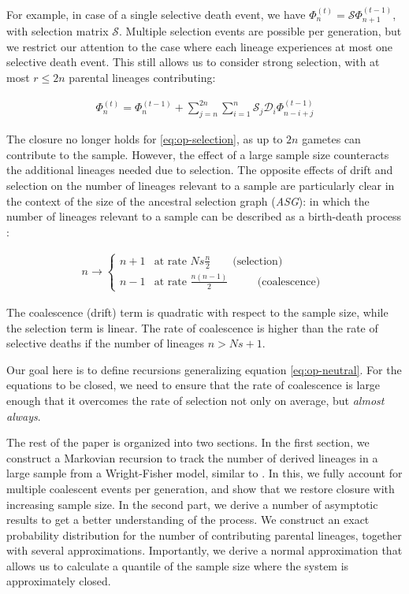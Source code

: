\documentclass[review]{elsarticle}
\newcommand{\ra}{\rightarrow}
\begin{document}
For example, in case of a single selective death event, we have
$\Phi_{n}^{(t)}=\mathcal{S}\Phi_{n+1}^{(t-1)}$, with selection matrix $\mathcal{S}$. Multiple
selection events are possible per generation, but we restrict our attention to the case where each
lineage experiences at most one selective death event. This still allows us to consider strong
selection, with at most $r\le 2n$ parental lineages contributing:

\begin{align}
  \label{eq:op-selection}
  \Phi_{n}^{(t)}=\Phi_{n}^{(t-1)}+ \sum_{j=n}^{2n} \sum_{i=1}^{n} \mathcal{S}_j \mathcal{D}_i \Phi_{n-i+j}^{(t-1)}
\end{align}

The closure no longer holds for \eqref{eq:op-selection}, as up to $2n$ gametes can contribute to the
sample. However, the effect of a large sample size counteracts the additional lineages needed due to
selection. The opposite effects of drift and selection on the number of lineages relevant to a
sample are particularly clear in the context of the size of the ancestral selection graph
(\textit{ASG}): in which the number of lineages relevant to a sample can be described as a
birth-death process \citep{KroneNeuhauser1997, Wakeley2009}:

\begin{align}
  \label{eq:asg-size}
  n \ra \begin{cases}
    n+1 & \text{at rate } Ns \frac{n}{2} \hspace{20pt} \text{ (selection) }\\
    n-1 & \text{at rate } \frac{n(n-1)}{2}   \hspace{28pt} \text{ (coalescence) }
  \end{cases}
\end{align}

The coalescence (drift) term is quadratic with respect to the sample size, while the selection term
is linear. The rate of coalescence is higher than the rate of selective deaths if the number of
lineages $n>Ns+1$.

Our goal here is to define recursions generalizing equation \eqref{eq:op-neutral}. For the equations
to be closed, we need to ensure that the rate of coalescence is large enough that it overcomes the
rate of selection not only on average, but \emph{almost always}.

The rest of the paper is organized into two sections. In the first section, we construct a Markovian
recursion to track the number of derived lineages in a large sample from a Wright-Fisher model,
similar to \citep{JouganousEtAl2017,KammEtAl2017}. In this, we fully account for multiple coalescent
events per generation, and show that we restore closure with increasing sample size. In the second
part, we derive a number of asymptotic results to get a better understanding of the process. We
construct an exact probability distribution for the number of contributing parental lineages,
together with several approximations. Importantly, we derive a normal approximation that allows us
to calculate a quantile of the sample size where the system is approximately closed.
\end{document}

